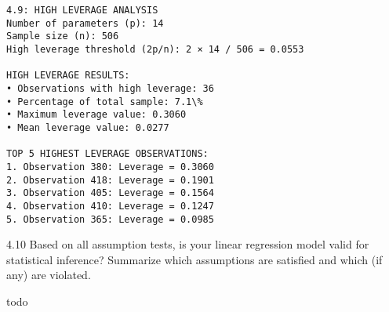 \documentclass[8pt, twocolumn]{extarticle}
\begin{document}
    \begin{Verbatim}[commandchars=\\\{\}]
4.9: HIGH LEVERAGE ANALYSIS
Number of parameters (p): 14
Sample size (n): 506
High leverage threshold (2p/n): 2 × 14 / 506 = 0.0553

HIGH LEVERAGE RESULTS:
• Observations with high leverage: 36
• Percentage of total sample: 7.1\%
• Maximum leverage value: 0.3060
• Mean leverage value: 0.0277

TOP 5 HIGHEST LEVERAGE OBSERVATIONS:
1. Observation 380: Leverage = 0.3060
2. Observation 418: Leverage = 0.1901
3. Observation 405: Leverage = 0.1564
4. Observation 410: Leverage = 0.1247
5. Observation 365: Leverage = 0.0985

    \end{Verbatim}

    4.10 Based on all assumption tests, is your linear regression model
valid for statistical inference? Summarize which assumptions are
satisfied and which (if any) are violated.

todo
\end{document}
